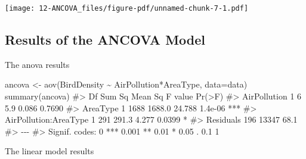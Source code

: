 \documentclass[
  letterpaper,
  DIV=11,
  numbers=noendperiod]{scrreprt}
\newenvironment{Shaded}{\begin{snugshade}}{\end{snugshade}}
\newcommand{\AttributeTok}[1]{\textcolor[rgb]{0.40,0.45,0.13}{#1}}
\newcommand{\CommentTok}[1]{\textcolor[rgb]{0.37,0.37,0.37}{#1}}
\newcommand{\FunctionTok}[1]{\textcolor[rgb]{0.28,0.35,0.67}{#1}}
\newcommand{\NormalTok}[1]{\textcolor[rgb]{0.00,0.23,0.31}{#1}}
\newcommand{\OtherTok}[1]{\textcolor[rgb]{0.00,0.23,0.31}{#1}}
\newcommand{\SpecialCharTok}[1]{\textcolor[rgb]{0.37,0.37,0.37}{#1}}
\begin{document}
\texttt{[image: 12-ANCOVA\_files/figure-pdf/unnamed-chunk-7-1.pdf]}

\subsection{Results of the ANCOVA
Model}\label{results-of-the-ancova-model}

The anova results

\begin{Shaded}
\begin{Highlighting}[]
\NormalTok{ancova }\OtherTok{\textless{}{-}} \FunctionTok{aov}\NormalTok{(BirdDensity }\SpecialCharTok{\textasciitilde{}}\NormalTok{ AirPollution}\SpecialCharTok{*}\NormalTok{AreaType, }\AttributeTok{data=}\NormalTok{data)}
\FunctionTok{summary}\NormalTok{(ancova)}
\CommentTok{\#\textgreater{}                        Df Sum Sq Mean Sq F value  Pr(\textgreater{}F)    }
\CommentTok{\#\textgreater{} AirPollution            1      6     5.9   0.086  0.7690    }
\CommentTok{\#\textgreater{} AreaType                1   1688  1688.0  24.788 1.4e{-}06 ***}
\CommentTok{\#\textgreater{} AirPollution:AreaType   1    291   291.3   4.277  0.0399 *  }
\CommentTok{\#\textgreater{} Residuals             196  13347    68.1                    }
\CommentTok{\#\textgreater{} {-}{-}{-}}
\CommentTok{\#\textgreater{} Signif. codes:  0 \textquotesingle{}***\textquotesingle{} 0.001 \textquotesingle{}**\textquotesingle{} 0.01 \textquotesingle{}*\textquotesingle{} 0.05 \textquotesingle{}.\textquotesingle{} 0.1 \textquotesingle{} \textquotesingle{} 1}
\end{Highlighting}
\end{Shaded}

The linear model results
\end{document}
